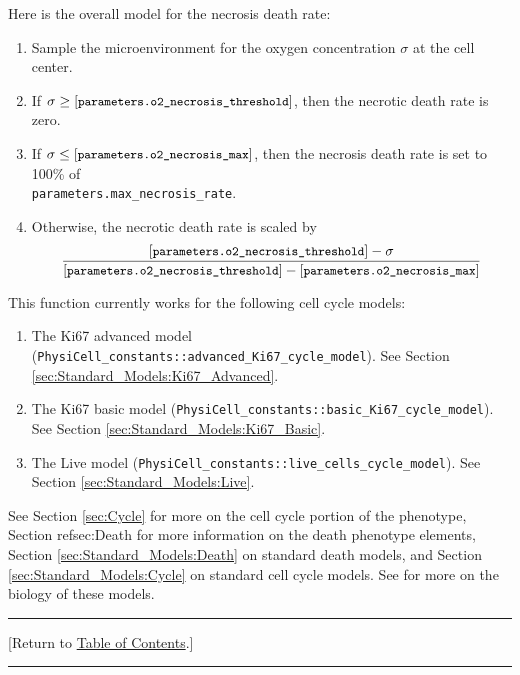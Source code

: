 \documentclass[12pt]{article}
\newcommand{\beq}{\begin{equation}}
\newcommand{\eeq}{\end{equation}}
\renewcommand{\v}{\verb}
\renewcommand{\tt}[1]{{\small \left[\texttt{#1}\right] }}
\newcommand{\TOClink}{\begin{center}\hrule\vskip-5pt\phantom{.}\hfill[Return to \hyperlink{TOC}{Table of Contents}.]\hfill\phantom{.}\vskip3pt\hrule\end{center}}
\begin{document}
Here is the overall model for the necrosis death rate: 
\begin{enumerate}
\item 
Sample the microenvironment for the oxygen concentration 
$\sigma$ at the 
cell center. 
\item 
If $\sigma \ge \tt{parameters.o2\_necrosis\_threshold}$, 
then the necrotic death rate is zero. 

\item 
If $\sigma \le \tt{parameters.o2\_necrosis\_max}$, 
then the necrosis death rate is set to 100\% of \\
\v|parameters.max_necrosis_rate|. 

\item 
Otherwise, the necrotic death rate is scaled by 
\beq
\frac{ \tt{parameters.o2\_necrosis\_threshold} - \sigma }
{\tt{parameters.o2\_necrosis\_threshold} - \tt{parameters.o2\_necrosis\_max} }
\eeq
\end{enumerate}

This function currently works for the following 
cell cycle models: 

\begin{enumerate}
\item 
The Ki67 advanced model 
(\v|PhysiCell_constants::advanced_Ki67_cycle_model|). See 
Section \ref{sec:Standard_Models:Ki67_Advanced}. 

\item 
The Ki67 basic model 
(\v|PhysiCell_constants::basic_Ki67_cycle_model|). See 
Section \ref{sec:Standard_Models:Ki67_Basic}. 

\item 
The Live model 
(\v|PhysiCell_constants::live_cells_cycle_model|). See 
Section \ref{sec:Standard_Models:Live}. 
\end{enumerate}

See Section \ref{sec:Cycle} for more on the cell cycle portion 
of the phenotype, Section ref{sec:Death} for more information 
on the death phenotype elements, 
Section \ref{sec:Standard_Models:Death} on standard death models, and  
Section \ref{sec:Standard_Models:Cycle} on standard cell cycle models. 
See \cite{ref:PhysiCell} for more on the biology of these 
models. 

\TOClink 
\end{document}
